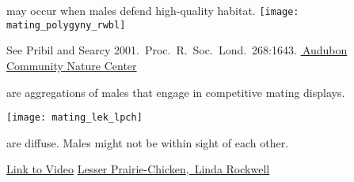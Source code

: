 \documentclass[t]{beamer}
\newcommand{\backskip}{\vspace{-0.5\baselineskip}}
\begin{document}
\begin{frame}[t]{ may occur when males defend high-quality habitat.}
\backskip
\centering
\texttt{[image: mating\_polygyny\_rwbl]}

\vfilll

\tiny See Pribil and Searcy 2001.~Proc.~R.~Soc.~Lond.~268:1643. \hfill \href{https://i0.wp.com/auduboncnc.org/wp-content/uploads/2018/06/Redwinged-blackbird-nest.jpg?ssl=1}{\textcopyright\,Audubon Community Nature Center}
\end{frame}


\begin{frame}[t]{ are aggregations of males that engage in competitive mating displays. }

\backskip

\texttt{[image: mating\_lek\_lpch]}

\backskip
\hangpara {} are diffuse. Males might not be within sight of each other.
\vfilll

\tiny \href{https://www.youtube.com/watch?v=OPzDtTyzGIg}{Link to Video} \hfill \href{https://photofeathers.wordpress.com/tag/lesser-prairie-chicken-festival/}{Lesser Prairie-Chicken, \textcopyright\,Linda Rockwell}

\end{frame}

\end{document}
